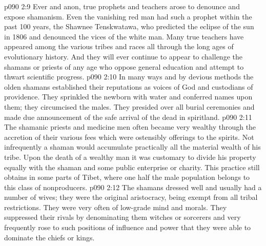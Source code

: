 \vs p090 2:9 Ever and anon, true prophets and teachers arose to denounce and expose shamanism. Even the vanishing red man had such a prophet within the past 100 years, the Shawnee Tenskwatawa, who predicted the eclipse of the sun in 1806 and denounced the vices of the white man. Many true teachers have appeared among the various tribes and races all through the long ages of evolutionary history. And they will ever continue to appear to challenge the shamans or priests of any age who oppose general education and attempt to thwart scientific progress.
\vs p090 2:10 In many ways and by devious methods the olden shamans established their reputations as voices of God and custodians of providence. They sprinkled the newborn with water and conferred names upon them; they circumcised the males. They presided over all burial ceremonies and made due announcement of the safe arrival of the dead in spiritland.
\vs p090 2:11 The shamanic priests and medicine men often became very wealthy through the accretion of their various fees which were ostensibly offerings to the spirits. Not infrequently a shaman would accumulate practically all the material wealth of his tribe. Upon the death of a wealthy man it was customary to divide his property equally with the shaman and some public enterprise or charity. This practice still obtains in some parts of Tibet, where one half the male population belongs to this class of nonproducers.
\vs p090 2:12 The shamans dressed well and usually had a number of wives; they were the original aristocracy, being exempt from all tribal restrictions. They were very often of low\hyp{}grade mind and morals. They suppressed their rivals by denominating them witches or sorcerers and very frequently rose to such positions of influence and power that they were able to dominate the chiefs or kings.
